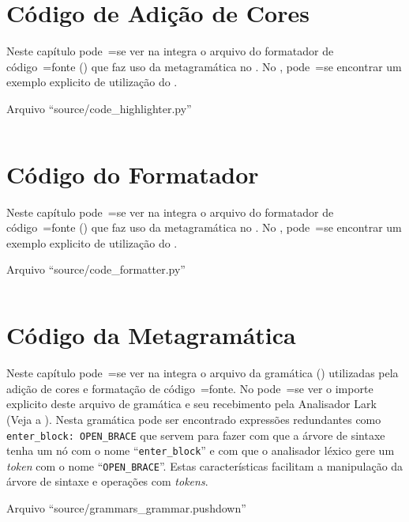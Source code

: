 \chapter{Código de Adição de Cores}

Neste capítulo pode~=se ver na integra o arquivo do formatador de código~=fonte () que faz uso da metagramática no .
No ,
pode~=se encontrar um exemplo explicito de utilização do .
\begin{code}
\caption{Arquivo ``source/code\_highlighter.py''}
\label{codeHighlighterPy}
\inputminted{python3}{../source/code_highlighter.py}
\end{code}


\chapter{Código do Formatador}

Neste capítulo pode~=se ver na integra o arquivo do formatador de código~=fonte () que faz uso da metagramática no .
No ,
pode~=se encontrar um exemplo explicito de utilização do .
\begin{code}
\caption{Arquivo ``source/code\_formatter.py''}
\label{codeFormatterPy}
\inputminted{python3}{../source/code_formatter.py}
\end{code}


\chapter{Código da Metagramática}

Neste capítulo pode~=se ver na integra o arquivo da gramática () utilizadas pela adição de cores e
formatação de código~=fonte.
No  pode~=se ver o importe explicito deste arquivo de gramática e
seu recebimento pela Analisador Lark (Veja a ).
Nesta gramática pode ser encontrado expressões redundantes como \texttt{enter_block:
OPEN_BRACE} que servem para fazer com que a árvore de sintaxe tenha um nó com o nome ``\texttt{enter_block}'' e
com que o analisador léxico gere um \textit{token} com o nome ``\texttt{OPEN_BRACE}''.
Estas características facilitam a manipulação da árvore de sintaxe e
operações com \textit{tokens}.
\begin{code}
\caption{Arquivo ``source/grammars\_grammar.pushdown''}
\label{grammarsGrammarPushdown}
\inputminted{antlr}{../source/grammars_grammar.pushdown}
\end{code}
